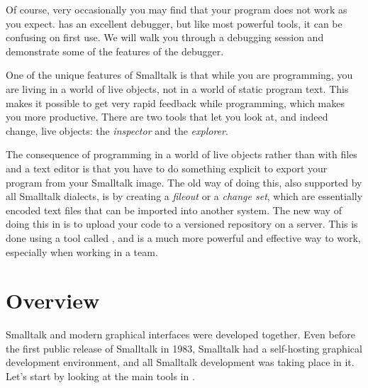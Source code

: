 \documentclass[a4paper,10pt,twoside]{book}
\begin{document}
Of course, very occasionally you may find that your program does not work as you expect. \pharo has an excellent debugger, but like most powerful tools, it can be confusing on first use.  We will walk you through a debugging session and demonstrate some of the features of the debugger. 

One of the unique features of Smalltalk is that while you are programming, you are living in a world of live objects, not in a world of static program text.  This makes it possible to get very rapid feedback while programming, which makes you more productive. There are two tools that let you look at, and indeed change, live objects: the \emph{inspector} and the \emph{explorer}.

The consequence of programming in a world of live objects rather than with files and a text editor is that you have to do something explicit to export your program from your Smalltalk image.  
The old way of doing this, also supported by all Smalltalk dialects, is by creating a \emph{fileout} or a \emph{change set}, which are essentially encoded text files that can be imported into another system.  
The new way of doing this in \pharo is to upload your code to a versioned repository on a server.  This is done using a tool called , and is a much more powerful and effective way to work, especially when working in a team.


\section{Overview}

Smalltalk and modern graphical interfaces were developed together.
Even before the first public release of Smalltalk in 1983, Smalltalk had a self-hosting graphical development environment, and all Smalltalk development was taking place in it.
Let's start by looking at the main tools in \pharo.
\end{document}
